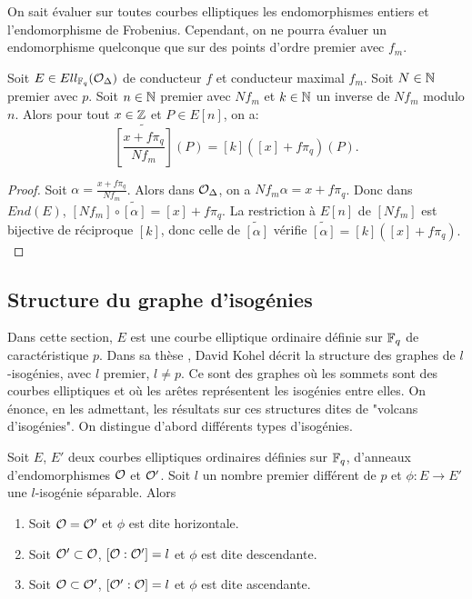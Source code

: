 On sait évaluer sur toutes courbes elliptiques les endomorphismes entiers et l'endomorphisme de Frobenius. Cependant, on ne pourra évaluer un endomorphisme quelconque que sur des points d'ordre premier avec $f_m$.

\begin{Prop}\label{evalEndoAvecDenom}
	Soit $E\in Ell_{\mathbb{F}_{q}}(\mathcal{O}_{\Delta})$ de conducteur $f$ et conducteur maximal $f_m$. Soit $N\in\mathbb{N}$ premier avec $p$. Soit $n\in\mathbb{N}$ premier avec $Nf_m$ et $k\in\mathbb{N}$ un inverse de $Nf_m$ modulo $n$. Alors pour tout $x\in\mathbb{Z}$ et $P\in E[n]$, on a:
	\begin{equation*}
		 \widetilde{\left[ \frac{x + f\pi_{q}}{Nf_m}\right]}(P) = \left[ k\right] (\left[ x\right]  + f\pi_{q})(P).
	\end{equation*}
\end{Prop}

\begin{proof}
	Soit $\alpha = \frac{x + f\pi_{q}}{Nf_m}$. Alors dans $\mathcal{O}_{\Delta}$, on a $Nf_m\alpha = x + f\pi_{q}$. Donc dans $End(E)$, $[Nf_m]\circ\widetilde{[\alpha]} = [x] + f\pi_q$. La restriction à $E[n]$ de $[Nf_m]$ est bijective de réciproque $[k]$, donc celle de $\widetilde{[\alpha]}$ vérifie $\widetilde{[\alpha]} = \left[ k\right] (\left[ x\right]  + f\pi_{q}).$
\end{proof}





\subsection{Structure du graphe d'isogénies}\label{SECTION volcanIsogenie}

Dans cette section, $E$ est une courbe elliptique ordinaire définie sur $\mathbb{F}_{q}$ de caractéristique $p$. Dans sa thèse \cite{Kohel}, David Kohel décrit la structure des graphes de $l$-isogénies, avec $l$ premier, $l\neq p$. Ce sont des graphes où les sommets sont des courbes elliptiques et où les arêtes représentent les isogénies entre elles. On énonce, en les admettant, les résultats sur ces structures dites de "volcans d'isogénies". On distingue d'abord différents types d'isogénies.

\begin{Prop}
	
	Soit $E$, $E'$ deux courbes elliptiques ordinaires définies sur $\mathbb{F}_{q}$, d'anneaux d'endomorphismes $\mathcal{O}$ et $\mathcal{O}'$. Soit $l$ un nombre premier différent de $p$ et $\phi : E\rightarrow E'$ une $l$-isogénie séparable. Alors
	\begin{enumerate}
		\item Soit $\mathcal{O} = \mathcal{O}'$ et $\phi$ est dite horizontale.
		\item Soit $\mathcal{O}'\subset \mathcal{O}$, $\left[ \mathcal{O} : \mathcal{O}' \right] = l$ et $\phi$ est dite descendante.
		\item Soit $\mathcal{O}\subset \mathcal{O}'$, $\left[ \mathcal{O}' : \mathcal{O} \right] = l$ et $\phi$ est dite ascendante.
	\end{enumerate}
\end{Prop}

